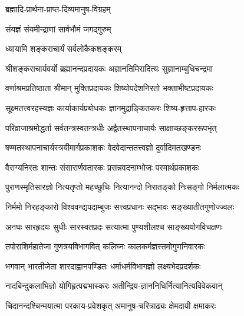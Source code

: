 

{ब्रह्मादि-प्रार्थना-प्राप्त-दिव्यमानुष-विग्रहम्}

{संयज्ञं संयमीन्द्राणां सार्वभौमं जगद्गुरुम्}

{ध्यायामि शङ्कराचार्यं सर्वलोकैकशङ्करम् }

\begin{minipage}{\linewidth}
    \centering
    \twolineshloka
    {श्रीशङ्कराचार्यवर्यो ब्रह्मानन्दप्रदायकः}
    {अज्ञानतिमिरादित्यः सुज्ञानाम्बुधिचन्द्रमा}
\end{minipage}

\twolineshloka
{वर्णाश्रमप्रतिष्ठाता श्रीमान् मुक्तिप्रदायकः}
{शिष्योपदेशनिरतो भक्ताभीष्टप्रदायकः}

\twolineshloka
{सूक्ष्मतत्त्वरहस्यज्ञः कार्याकार्यप्रबोधकः}
{ज्ञानमुद्राङ्कितकरः शिष्य-हृत्ताप-हारकः}

\twolineshloka
{परिव्राजाश्रमोद्धर्ता सर्वतन्त्रस्वतन्त्रधीः}
{अद्वैतस्थापनाचार्यः साक्षाच्छङ्कररूपभृत्}

\twolineshloka
{षण्मतस्थापनाचार्यस्त्रयीमार्गप्रकाशकः}
{वेदवेदान्ततत्त्वज्ञो दुर्वादिमतखण्डनः}

\twolineshloka
{वैराग्यनिरतः शान्तः संसारार्णवतारकः}
{प्रसन्नवदनाम्भोजः परमार्थप्रकाशकः}

\twolineshloka
{पुराणस्मृतिसारज्ञो नित्यतृप्तो महच्छुचिः}
{नित्यानन्दो निरातङ्को निःसङ्गो निर्मलात्मकः}

\twolineshloka
{निर्ममो निरहङ्कारो विश्ववन्द्यपदाम्बुजः}
{सत्त्वप्रधानः सद्भावः सङ्ख्यातीतगुणोज्ज्वलः}

\twolineshloka
{अनघः सारहृदयः सुधीः सारस्वतप्रदः}
{सत्यात्मा पुण्यशीलश्च साङ्ख्ययोगविचक्षणः}

\twolineshloka
{तपोराशिर्महातेजा गुणत्रयविभागवित्}
{कलिघ्नः कालकर्मज्ञस्तमोगुणनिवारकः}

\twolineshloka
{भगवान् भारतीजेता शारदाह्वानपण्डितः}
{धर्माधर्मविभागज्ञो लक्ष्यभेदप्रदर्शकः}

\twolineshloka
{नादबिन्दुकलाभिज्ञो योगिहृत्पद्मभास्करः}
{अतीन्द्रिय-ज्ञाननिधिर्नित्यानित्यविवेकवान्}

\twolineshloka
{चिदानन्दश्चिन्मयात्मा परकाय-प्रवेशकृत्}
{अमानुष-चरित्राढ्यः क्षेमदायी क्षमाकरः}

